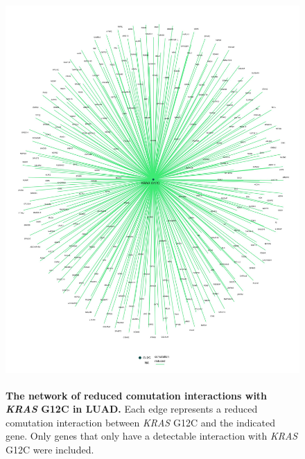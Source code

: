 \documentclass[english, 12pt, letterpaper]{article}
\newcommand{\KRAS}{\emph{KRAS}}
\begin{document}
\begin{figure}[p]
\centering
\includegraphics[height=150mm]{figures/SuppFigure_07.jpeg}
\caption{
    \textbf{The network of reduced comutation interactions with \KRAS{} G12C in LUAD.} Each edge represents a reduced comutation interaction between \KRAS{} G12C and the indicated gene. Only genes that only have a detectable interaction with \KRAS{} G12C were included.
}
\label{sfig:luad_labeled-G12C-reduced-comutation}
\end{figure}
\end{document}
